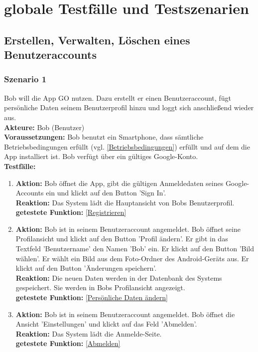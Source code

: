\documentclass[parskip=full]{scrartcl}
\def\threedigits#1{%
  \ifnum#1<100 0\fi
  \ifnum#1<10 0\fi
  \number#1}
\begin{document}

\newpage
\section{globale Testfälle und Testszenarien}

\subsection{Erstellen, Verwalten, Löschen eines Benutzeraccounts}

\subsubsection*{Szenario 1}Bob will die App GO nutzen. Dazu erstellt er einen Benutzeraccount, fügt persönliche Daten seinem Benutzerprofil hinzu und loggt sich anschließend wieder aus.\\

\textbf{Akteure:} Bob (Benutzer) \\

\textbf{Voraussetzungen: }Bob benutzt ein Smartphone, dass sämtliche Betriebsbedingungen erfüllt (vgl. \ref{Betriebsbedingungen}) erfüllt und auf dem die App installiert ist. Bob verfügt über ein gültiges Google-Konto.\\

\textbf{Testfälle:}
\begin{enumerate}[label={\textbf{/T\protect\threedigits{\theenumi}0/}}, leftmargin=*]
	\item\label{Registrieren-Test} \textbf{Aktion:} Bob öffnet die App, gibt die gültigen Anmeldedaten seines Google-Accounts ein und klickt auf den Button 'Sign In'. \\
									\textbf{Reaktion:} Das System lädt die Hauptansicht von Bobs Benutzerprofil.\\
									\textbf{getestete Funktion: }\ref{Registrieren}
	\item \textbf{Aktion:} Bob ist in seinem Benutzeraccount angemeldet. Bob öffnet seine Profilansicht und klickt auf den Button 'Profil ändern'. Er gibt in das Textfeld 'Benutzername' den Namen 'Bob' ein. Er klickt auf den Button 'Bild wählen'. Er wählt ein Bild aus dem Foto-Ordner des Android-Geräts aus. Er klickt auf den Button 'Änderungen speichern'. \\
		  \textbf{Reaktion:} Die neuen Daten werden in der Datenbank des Systems gespeichert. Sie werden in Bobs Profilansicht angezeigt.\\
		  \textbf{getestete Funktion: }\ref{Persönliche Daten ändern}
	\item \textbf{Aktion:} Bob ist in seinem Benutzeraccount angemeldet. Bob öffnet die Ansicht 'Einstellungen' und klickt auf das Feld 'Abmelden'.\\
		  \textbf{Reaktion:} Das System lädt die Anmelde-Seite.\\
		  \textbf{getestete Funktion: }\ref{Abmelden}
\end{enumerate}
\end{document}
